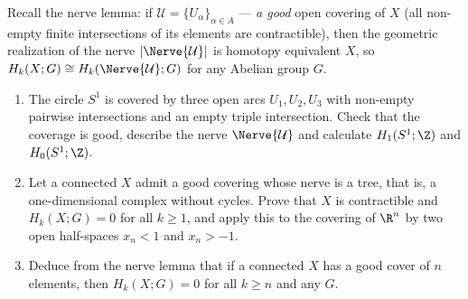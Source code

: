 \documentclass[a4paper,12pt]{report}
\begin{document}
\begin{task}
Recall the nerve lemma\textup{:} if $\mathcal U = \{U_\alpha\}_{\alpha \in A}$ --- \emph{a good} open covering of $X$ \textup{(}all non-empty finite intersections of its elements are contractible\textup{)}, then the geometric realization of the nerve $|\Nerve{\mathcal U}|$ is homotopy equivalent $X$, so $H_k(X; G) \cong H_k(\Nerve{\mathcal U}; G)$ for any Abelian group $G$.
\begin{enumerate}[label=\textup{(\alph*)}]
\item The circle $S^1$ is covered by three open arcs $U_1, U_2, U_3$ with non-empty pairwise intersections and an empty triple intersection. Check that the coverage is good, describe the nerve $\Nerve{\mathcal U}$ and calculate $H_1(S^1; \Z)$ and $H_0(S^1; \Z)$.
\item Let a connected $X$ admit a good covering whose nerve is a tree, that is, a one-dimensional complex without cycles. Prove that $X$ is contractible and $H_k(X; G) = 0$ for all $k \ge 1$, and apply this to the covering of $\R^n$ by two open half-spaces $x_n < 1$ and $x_n > -1$.
\item Deduce from the nerve lemma that if a connected $X$ has a good cover of $n$ elements, then $H_k(X; G) = 0$ for all $k \ge n$ and any $G$. 
\end{enumerate}
\end{task}
\end{document}
